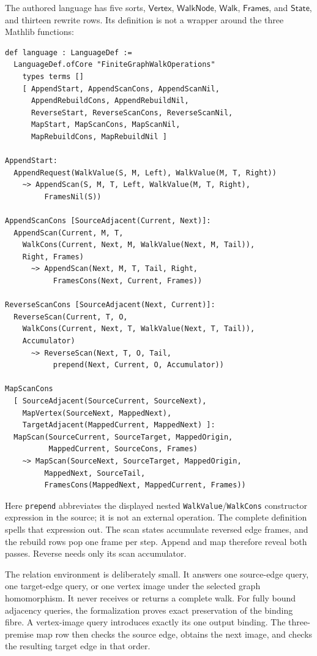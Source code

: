 \documentclass[11pt]{article}
\theoremstyle{remark}
\newcommand{\code}[1]{\texttt{#1}}
\begin{document}
The authored language has five sorts,
\(\mathsf{Vertex}\), \(\mathsf{WalkNode}\), \(\mathsf{Walk}\),
\(\mathsf{Frames}\), and \(\mathsf{State}\), and thirteen rewrite rows.  Its
definition is not a wrapper around the three Mathlib functions:
\begin{lstlisting}[style=graphlang,language={}]
def language : LanguageDef :=
  LanguageDef.ofCore "FiniteGraphWalkOperations"
    types terms []
    [ AppendStart, AppendScanCons, AppendScanNil,
      AppendRebuildCons, AppendRebuildNil,
      ReverseStart, ReverseScanCons, ReverseScanNil,
      MapStart, MapScanCons, MapScanNil,
      MapRebuildCons, MapRebuildNil ]

AppendStart:
  AppendRequest(WalkValue(S, M, Left), WalkValue(M, T, Right))
    ~> AppendScan(S, M, T, Left, WalkValue(M, T, Right),
         FramesNil(S))

AppendScanCons [SourceAdjacent(Current, Next)]:
  AppendScan(Current, M, T,
    WalkCons(Current, Next, M, WalkValue(Next, M, Tail)),
    Right, Frames)
      ~> AppendScan(Next, M, T, Tail, Right,
           FramesCons(Next, Current, Frames))

ReverseScanCons [SourceAdjacent(Next, Current)]:
  ReverseScan(Current, T, O,
    WalkCons(Current, Next, T, WalkValue(Next, T, Tail)),
    Accumulator)
      ~> ReverseScan(Next, T, O, Tail,
           prepend(Next, Current, O, Accumulator))

MapScanCons
  [ SourceAdjacent(SourceCurrent, SourceNext),
    MapVertex(SourceNext, MappedNext),
    TargetAdjacent(MappedCurrent, MappedNext) ]:
  MapScan(SourceCurrent, SourceTarget, MappedOrigin,
          MappedCurrent, SourceCons, Frames)
    ~> MapScan(SourceNext, SourceTarget, MappedOrigin,
         MappedNext, SourceTail,
         FramesCons(MappedNext, MappedCurrent, Frames))
\end{lstlisting}
Here \code{prepend} abbreviates the displayed nested
\code{WalkValue}/\code{WalkCons} constructor expression in the source; it is
not an external operation.  The complete definition spells that expression
out.  The scan states accumulate reversed edge frames, and the rebuild rows
pop one frame per step.  Append and map therefore reveal both passes.  Reverse
needs only its scan accumulator.

The relation environment is deliberately small.  It answers one source-edge
query, one target-edge query, or one vertex image under the selected graph
homomorphism.  It never receives or returns a complete walk.  For fully bound
adjacency queries, the formalization proves exact preservation of the binding
fibre.  A vertex-image query introduces exactly its one output binding.  The
three-premise map row then checks the source edge, obtains the next image, and
checks the resulting target edge in that order.
\end{document}

